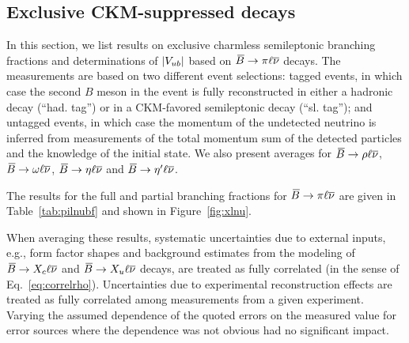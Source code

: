 \subsection{Exclusive CKM-suppressed decays}
\label{slbdecays_b2uexcl}
In this section, we list results on exclusive charmless semileptonic branching fractions
and determinations of $|V_{ub}|$ based on $\kern 0.18em\overline{\kern -0.18em B}{}\to\pi\ell\overline{\nu}$ decays.
The measurements are based on two different event selections: tagged
events, in which case the second $B$ meson in the event is fully
reconstructed in either a hadronic decay (``had. tag'') or in a 
CKM-favored semileptonic decay (``sl. tag''); and untagged events, in which case the momentum
of the undetected neutrino is inferred from measurements of the total 
momentum sum of the detected particles and the knowledge of the initial state.
We also present averages for $\kern 0.18em\overline{\kern -0.18em B}{}\to\rho\ell\overline{\nu}$, $\kern 0.18em\overline{\kern -0.18em B}{}\to\omega\ell\overline{\nu}$, $\kern 0.18em\overline{\kern -0.18em B}{}\to\eta\ell\overline{\nu}$ and
$\kern 0.18em\overline{\kern -0.18em B}{}\to\eta'\ell\overline{\nu}$.

The results for the full and partial branching fractions for $\kern 0.18em\overline{\kern -0.18em B}{}\to\pi\ell\overline{\nu}$ are given
in Table~\ref{tab:pilnubf} and shown in Figure~\ref{fig:xlnu}.   

When averaging these results, systematic uncertainties due to external
inputs, e.g., form factor shapes and background estimates from the
modeling of $\kern 0.18em\overline{\kern -0.18em B}{}\to X_c\ell\overline{\nu}$ and $\kern 0.18em\overline{\kern -0.18em B}{}\to X_u\ell\overline{\nu}$ decays, are
treated as fully correlated (in the sense of Eq.~\ref{eq:correlrho}).
Uncertainties due to experimental reconstruction effects are treated
as fully correlated among measurements from a given experiment. Varying
the assumed dependence of the quoted errors on the measured value
for error sources where the dependence was not obvious had no significant impact.



